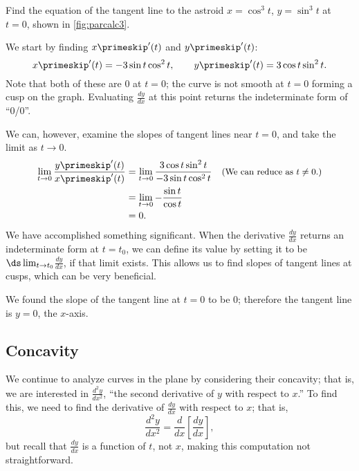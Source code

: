 {Find the equation of the tangent line to the astroid $x=\cos^3 t$, $y=\sin^3t$ at $t=0$, shown in \autoref{fig:parcalc3}.
}
{We start by finding $x\primeskip'(t)$ and $y\primeskip'(t)$:
$$ x\primeskip'(t) = -3\sin t\cos^2t, \qquad y\primeskip'(t) = 3\cos t\sin^2t.$$
Note that both of these are 0 at $t=0$; the curve is not smooth at $t=0$ forming a cusp on the graph. Evaluating $\frac{dy}{dx}$ at this point returns the indeterminate form of ``0/0''. 

We can, however, examine the slopes of tangent lines near $t=0$, and take the limit as $t\to 0$. 
\begin{align*}
	\lim_{t\to0} \frac{y\primeskip'(t)}{x\primeskip'(t)}
	&=\lim_{t\to0} \frac{3\cos t\sin^2t}{-3\sin t\cos^2t}
	\quad \text{\small (We can reduce as $t\neq 0$.)}\\
	&= \lim_{t\to0} -\frac{\sin t}{\cos t}\\
	&= 0.
\end{align*}
We have accomplished something significant. When the derivative $\frac{dy}{dx}$ returns an indeterminate form at $t=t_0$, we can define its value by setting it to be $\ds \lim_{t\to t_0} $$\frac{dy}{dx}$, if that limit exists. This allows us to find slopes of tangent lines at cusps, which can be very beneficial. 

We found the slope of the tangent line at $t=0$ to be 0; therefore the tangent line is $y=0$, the $x$-axis.}

\subsection*{Concavity}

We continue to analyze curves in the plane by considering their concavity; that is, we are interested in $\frac{d^2y}{dx^2}$, ``the second derivative of $y$ with respect to $x$.'' To find this, we need to find the derivative of $\frac{dy}{dx}$ with respect to $x$; that is,  $$\frac{d^2y}{dx^2}=\frac{d}{dx}\left[\frac{dy}{dx}\right],$$ but recall that $\frac{dy}{dx}$ is a function of $t$, not $x$, making this computation not straightforward. 


